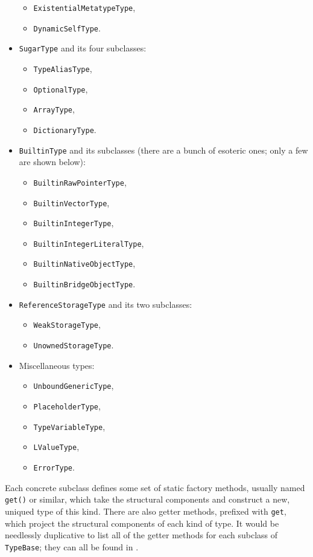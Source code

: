 \documentclass[../generics]{subfiles}
\begin{document}
\begin{itemize}
\begin{itemize}
\item \texttt{ExistentialMetatypeType},
\item \texttt{DynamicSelfType}.
\end{itemize}
\item \texttt{SugarType} and its four subclasses:
\begin{itemize}
\item \texttt{TypeAliasType},
\item \texttt{OptionalType},
\item \texttt{ArrayType},
\item \texttt{DictionaryType}.
\end{itemize}
\item \texttt{BuiltinType} and its subclasses (there are a bunch of esoteric ones; only a few are shown below):
\begin{itemize}
\item \texttt{BuiltinRawPointerType},
\item \texttt{BuiltinVectorType},
\item \texttt{BuiltinIntegerType},
\item \texttt{BuiltinIntegerLiteralType},
\item \texttt{BuiltinNativeObjectType},
\item \texttt{BuiltinBridgeObjectType}.
\end{itemize}
\item \texttt{ReferenceStorageType} and its two subclasses:
\begin{itemize}
\item \texttt{WeakStorageType},
\item \texttt{UnownedStorageType}.
\end{itemize}
\item Miscellaneous types:
\begin{itemize}
\item \texttt{UnboundGenericType},
\item \texttt{PlaceholderType},
\item \texttt{TypeVariableType},
\item \texttt{LValueType},
\item \texttt{ErrorType}.
\end{itemize}
\end{itemize}
Each concrete subclass defines some set of static factory methods, usually named \texttt{get()} or similar, which take the structural components and construct a new, uniqued type of this kind. There are also getter methods, prefixed with \texttt{get}, which project the structural components of each kind of type. It would be needlessly duplicative to list all of the getter methods for each subclass of \texttt{TypeBase}; they can all be found in .
\end{document}

